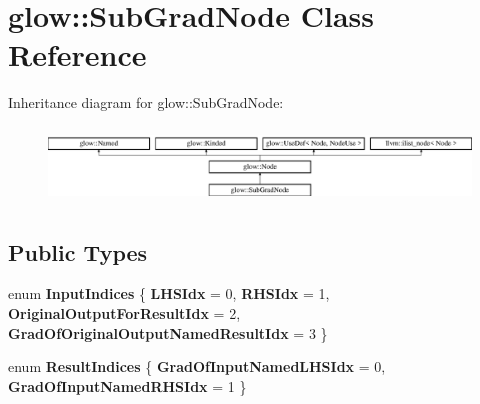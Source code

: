 \hypertarget{classglow_1_1_sub_grad_node}{}\section{glow\+:\+:Sub\+Grad\+Node Class Reference}
\label{classglow_1_1_sub_grad_node}
Inheritance diagram for glow\+:\+:Sub\+Grad\+Node\+:\begin{figure}[H]
\begin{center}
\leavevmode
\includegraphics[height=2.028986cm]{classglow_1_1_sub_grad_node}
\end{center}
\end{figure}
\subsection*{Public Types}
\begin{DoxyCompactItemize}
\item 
\mbox{\label{classglow_1_1_sub_grad_node_a5408a71a3d7d5efd44301d8c11ff105b}} 
enum {\bfseries Input\+Indices} \{ {\bfseries L\+H\+S\+Idx} = 0, 
{\bfseries R\+H\+S\+Idx} = 1, 
{\bfseries Original\+Output\+For\+Result\+Idx} = 2, 
{\bfseries Grad\+Of\+Original\+Output\+Named\+Result\+Idx} = 3
 \}
\item 
\mbox{\label{classglow_1_1_sub_grad_node_a8f139e686b99efd4e48f8c4f54bfd23e}} 
enum {\bfseries Result\+Indices} \{ {\bfseries Grad\+Of\+Input\+Named\+L\+H\+S\+Idx} = 0, 
{\bfseries Grad\+Of\+Input\+Named\+R\+H\+S\+Idx} = 1
 \}
\end{DoxyCompactItemize}
